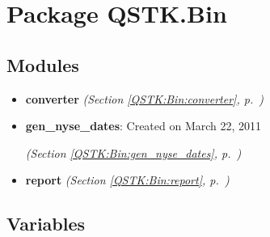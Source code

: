 %
%
%


\section{Package QSTK.Bin}

    \label{QSTK:Bin}


\subsection{Modules}

\begin{itemize}
\setlength{\parskip}{0ex}
\item \textbf{converter}
  \textit{(Section \ref{QSTK:Bin:converter}, p.~\pageref{QSTK:Bin:converter})}

\item \textbf{gen\_nyse\_dates}: Created on March 22, 2011



  \textit{(Section \ref{QSTK:Bin:gen_nyse_dates}, p.~\pageref{QSTK:Bin:gen_nyse_dates})}

\item \textbf{report}
  \textit{(Section \ref{QSTK:Bin:report}, p.~\pageref{QSTK:Bin:report})}

\end{itemize}



  \subsection{Variables}

